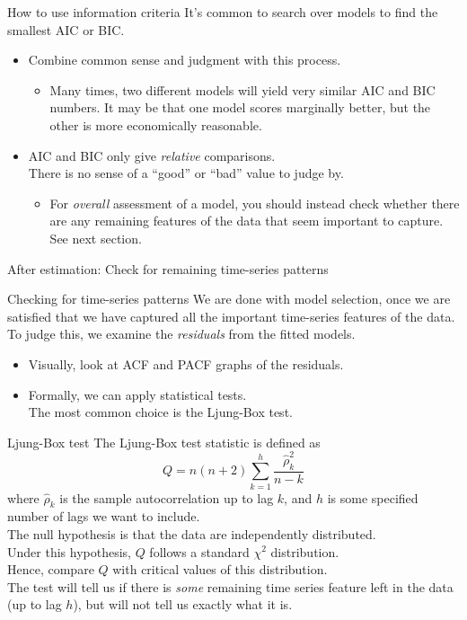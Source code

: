 \documentclass[t,12pt]{beamer}
\begin{document}
\begin{frame}[c]{How to use information criteria}
It's common to search over models to find the smallest AIC or BIC.
\begin{itemize}
\bigskip
\item Combine common sense and judgment with this process.
\begin{itemize}
\item Many times, two different models will yield very similar AIC and BIC numbers. It may be that one model scores marginally better, but the other is more economically reasonable.
\end{itemize}
\medskip
\item AIC and BIC only give \emph{relative} comparisons. 
\\ There is no sense of a ``good'' or ``bad'' value to judge by.
\begin{itemize}
\item For \emph{overall} assessment of a model, you should instead check whether there are any remaining features of the data that seem important to capture.
See next section.
\end{itemize}
\end{itemize}
\end{frame}

\begin{frame}[c]
\vfill
\centerline{After estimation: Check for remaining time-series patterns}
\vfill
\end{frame}

\begin{frame}[c]{Checking for time-series patterns}
We are done with model selection, once we are satisfied that we have captured all the important time-series features of the data.
\\ \bigskip
To judge this, we examine the \emph{residuals} from the fitted models.
\begin{itemize}
\medskip
\item Visually, look at ACF and PACF graphs of the residuals.
\medskip
\item Formally, we can apply statistical tests.
\\ The most common choice is the Ljung-Box test.
\end{itemize}
\end{frame}

\begin{frame}[c]{Ljung-Box test}
The Ljung-Box test statistic is defined as 
$$
Q = n(n+2) \sum_{k=1}^h \frac{\hat{\rho}_k^2}{n-k}
$$
where $\hat{\rho}_k$ is the sample autocorrelation up to lag $k$, and $h$ is some specified number of lags we want to include.
\\ \medskip
The null hypothesis is that the data are independently distributed. 
\\ Under this hypothesis, $Q$ follows a standard $\chi^2$ distribution.
\\ \medskip
Hence, compare $Q$ with critical values of this distribution.
\\ \medskip
The test will tell us if there is \emph{some} remaining time series feature left in the data (up to lag $h$), but will not tell us exactly what it is.
\end{frame}
\end{document}
